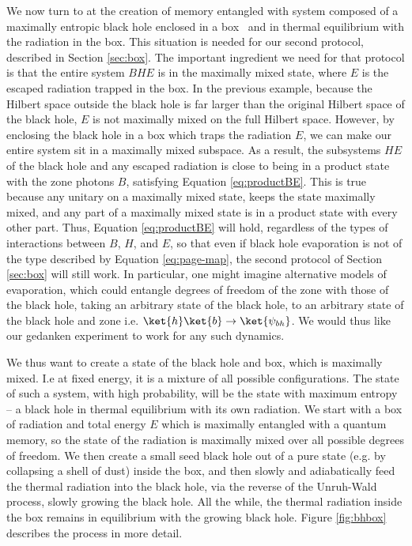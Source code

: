 \documentclass[11pt,a4paper]{article}
\begin{document}
We now turn to at the creation of memory entangled with system composed of a maximally entropic black hole enclosed in a box~\cite{hawking1976black,hawking1983thermodynamics} and in thermal equilibrium with the radiation in the box. This situation is needed for our second protocol, described in Section \ref{sec:box}. 
The important ingredient we need for that protocol is that the entire system $BHE$ is in the maximally mixed state, where $E$ is the escaped radiation trapped in the box. In the previous example, because the Hilbert space outside the black hole is far larger than the original Hilbert space of the black hole, $E$ is not maximally mixed on the full Hilbert space. However, by enclosing the black hole in a box which traps the radiation $E$, we can make our entire system sit in a maximally mixed subspace. As a result,
the subsystems $HE$ of the black hole and any escaped radiation is close to being in a product state with the zone photons $B$, satisfying Equation \eqref{eq:productBE}. This is true because any unitary on a maximally mixed state, keeps the state maximally mixed, and any part of a maximally mixed state is in a product state with every other part. Thus, Equation \eqref{eq:productBE} will hold, regardless of the types of interactions between $B$, $H$, and $E$, so that even if black hole evaporation is not of the type described by Equation \eqref{eq:page-map}, the second protocol of Section \ref{sec:box} will still work. In particular, one might imagine alternative models of evaporation, which could entangle degrees of freedom of the zone with those of the black hole, taking an arbitrary state of the black hole, to an arbitrary state of the black hole and zone i.e. $\ket{h}\ket{b}\rightarrow\ket{\psi_{bh}}$. We would thus like our gedanken experiment to work for any such dynamics.

 
We thus want to create a state of the black hole and box, which is maximally mixed. I.e at fixed energy, it is a mixture of all possible configurations. The state of such a system, with high probability, will be the state with maximum entropy -- a black hole in thermal equilibrium with its own radiation. We start with a box of radiation and total energy $E$ which is maximally entangled with a quantum memory, so the state of the radiation is maximally mixed over all possible degrees of freedom. We then create a small seed black hole out of a pure state (e.g. by collapsing a shell of dust) inside the box, and then slowly and adiabatically feed the thermal radiation into the black hole, via the reverse of the Unruh-Wald process, slowly growing the black hole. All the while, the thermal radiation inside the box remains in equilibrium with the growing black hole.  Figure \ref{fig:bhbox} describes the process in more detail.
\end{document}
